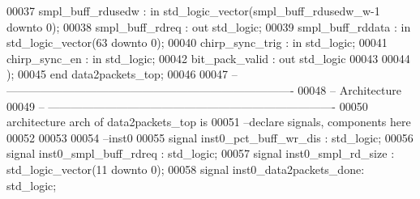 \begin{DoxyCode}
00037       \textcolor{vhdlchar}{smpl_buff_rdusedw} \textcolor{vhdlchar}{:} \textcolor{keywordflow}{in} \textcolor{comment}{std\_logic\_vector}\textcolor{vhdlchar}{(}\textcolor{vhdlchar}{smpl_buff_rdusedw_w}\textcolor{vhdlchar}{-}\textcolor{vhdllogic}{}\textcolor{vhdllogic}{1} \textcolor{keywordflow}{downto} \textcolor{vhdllogic}{}\textcolor{vhdllogic}{0}\textcolor{vhdlchar}{)};
00038       \textcolor{vhdlchar}{smpl_buff_rdreq}   \textcolor{vhdlchar}{:} \textcolor{keywordflow}{out} \textcolor{comment}{std\_logic};
00039       \textcolor{vhdlchar}{smpl_buff_rddata}  \textcolor{vhdlchar}{:} \textcolor{keywordflow}{in} \textcolor{comment}{std\_logic\_vector}\textcolor{vhdlchar}{(}\textcolor{vhdllogic}{}\textcolor{vhdllogic}{63} \textcolor{keywordflow}{downto} \textcolor{vhdllogic}{}\textcolor{vhdllogic}{0}\textcolor{vhdlchar}{)};
00040         \textcolor{vhdlchar}{chirp_sync_trig} \textcolor{vhdlchar}{:} \textcolor{keywordflow}{in} \textcolor{comment}{std\_logic};
00041         \textcolor{vhdlchar}{chirp_sync_en}       \textcolor{vhdlchar}{:} \textcolor{keywordflow}{in} \textcolor{comment}{std\_logic};
00042         \textcolor{vhdlchar}{bit_pack_valid}      \textcolor{vhdlchar}{:} \textcolor{keywordflow}{out} \textcolor{comment}{std\_logic}
00043     
00044         \textcolor{vhdlchar}{)};
00045 \textcolor{keywordflow}{end} \textcolor{vhdlchar}{data2packets\_top};
00046 
00047 \textcolor{keyword}{-- ----------------------------------------------------------------------------}
00048 \textcolor{keyword}{-- Architecture}
00049 \textcolor{keyword}{-- ----------------------------------------------------------------------------}
00050 \textcolor{keywordflow}{architecture} arch \textcolor{keywordflow}{of} data2packets_top is
00051 \textcolor{keyword}{--declare signals,  components here}
00052 
00053 
00054 \textcolor{keyword}{--inst0 }
00055 \textcolor{keywordflow}{signal} \textcolor{vhdlchar}{inst0_pct_buff_wr_dis}  \textcolor{vhdlchar}{:} \textcolor{comment}{std\_logic};
00056 \textcolor{keywordflow}{signal} \textcolor{vhdlchar}{inst0_smpl_buff_rdreq}  \textcolor{vhdlchar}{:} \textcolor{comment}{std\_logic};
00057 \textcolor{keywordflow}{signal} \textcolor{vhdlchar}{inst0_smpl_rd_size}     \textcolor{vhdlchar}{:} \textcolor{comment}{std\_logic\_vector}\textcolor{vhdlchar}{(}\textcolor{vhdllogic}{}\textcolor{vhdllogic}{11} \textcolor{keywordflow}{downto} \textcolor{vhdllogic}{}\textcolor{vhdllogic}{0}\textcolor{vhdlchar}{)}; 
00058 \textcolor{keywordflow}{signal} \textcolor{vhdlchar}{inst0_data2packets_done}\textcolor{vhdlchar}{:} \textcolor{comment}{std\_logic};

\end{DoxyCode}
